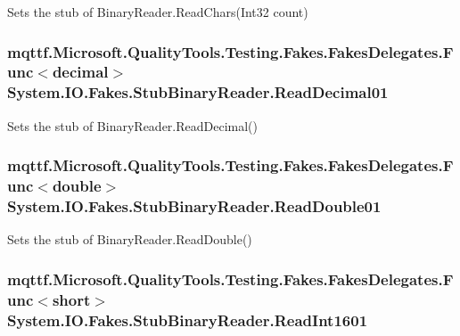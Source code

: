 Sets the stub of Binary\-Reader.\-Read\-Chars(\-Int32 count)

\hypertarget{class_system_1_1_i_o_1_1_fakes_1_1_stub_binary_reader_a94e4483c6ce663e8b2ccf0b5849324f8}{
\subsubsection[{Read\-Decimal01}]{\setlength{\rightskip}{0pt plus 5cm}mqttf.\-Microsoft.\-Quality\-Tools.\-Testing.\-Fakes.\-Fakes\-Delegates.\-Func$<$decimal$>$ System.\-I\-O.\-Fakes.\-Stub\-Binary\-Reader.\-Read\-Decimal01}}\label{class_system_1_1_i_o_1_1_fakes_1_1_stub_binary_reader_a94e4483c6ce663e8b2ccf0b5849324f8}


Sets the stub of Binary\-Reader.\-Read\-Decimal()

\hypertarget{class_system_1_1_i_o_1_1_fakes_1_1_stub_binary_reader_a2a788e60599817ff466a6916cd5664e6}{
\subsubsection[{Read\-Double01}]{\setlength{\rightskip}{0pt plus 5cm}mqttf.\-Microsoft.\-Quality\-Tools.\-Testing.\-Fakes.\-Fakes\-Delegates.\-Func$<$double$>$ System.\-I\-O.\-Fakes.\-Stub\-Binary\-Reader.\-Read\-Double01}}\label{class_system_1_1_i_o_1_1_fakes_1_1_stub_binary_reader_a2a788e60599817ff466a6916cd5664e6}


Sets the stub of Binary\-Reader.\-Read\-Double()

\hypertarget{class_system_1_1_i_o_1_1_fakes_1_1_stub_binary_reader_acae8435f0c3a13da2e9a5a8a580cf766}{
\subsubsection[{Read\-Int1601}]{\setlength{\rightskip}{0pt plus 5cm}mqttf.\-Microsoft.\-Quality\-Tools.\-Testing.\-Fakes.\-Fakes\-Delegates.\-Func$<$short$>$ System.\-I\-O.\-Fakes.\-Stub\-Binary\-Reader.\-Read\-Int1601}}\label{class_system_1_1_i_o_1_1_fakes_1_1_stub_binary_reader_acae8435f0c3a13da2e9a5a8a580cf766}


